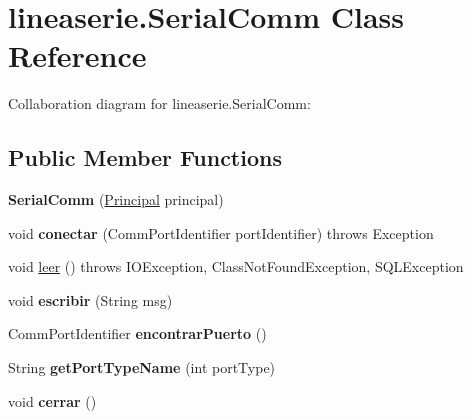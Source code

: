 \hypertarget{classlineaserie_1_1_serial_comm}{}\section{lineaserie.\+Serial\+Comm Class Reference}
\label{classlineaserie_1_1_serial_comm}


Collaboration diagram for lineaserie.\+Serial\+Comm\+:
\subsection*{Public Member Functions}
\begin{DoxyCompactItemize}
\item 
\mbox{\label{classlineaserie_1_1_serial_comm_af7acba71f36fc78ac2555f52cb6e6c91}} 
{\bfseries Serial\+Comm} (\mbox{\hyperlink{classvistas_1_1_principal}{Principal}} principal)
\item 
\mbox{\label{classlineaserie_1_1_serial_comm_a877035aa389c7d3ceef75f1927afd4d5}} 
void {\bfseries conectar} (Comm\+Port\+Identifier port\+Identifier)  throws Exception     
\item 
void \mbox{\hyperlink{classlineaserie_1_1_serial_comm_a9e5dc899a435cb7bbd14c50af1e69a9e}{leer}} ()  throws I\+O\+Exception, Class\+Not\+Found\+Exception, S\+Q\+L\+Exception     
\item 
\mbox{\label{classlineaserie_1_1_serial_comm_aafba8fce6137b4b5a5e7795f07fef02c}} 
void {\bfseries escribir} (String msg)
\item 
\mbox{\label{classlineaserie_1_1_serial_comm_ac940f6b749e1137f5f1233b320e0e46f}} 
Comm\+Port\+Identifier {\bfseries encontrar\+Puerto} ()
\item 
\mbox{\label{classlineaserie_1_1_serial_comm_ae0ae445e9464e90c1f4ebe3e943d0788}} 
String {\bfseries get\+Port\+Type\+Name} (int port\+Type)
\item 
\mbox{\label{classlineaserie_1_1_serial_comm_a4bc07b152edbc3d04b42677ee93e3504}} 
void {\bfseries cerrar} ()
\end{DoxyCompactItemize}


